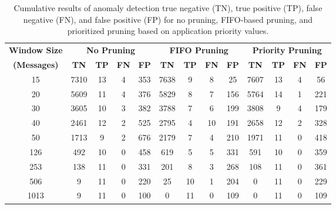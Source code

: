 \begin{table}[] \centering

\caption{Cumulative results of anomaly detection true negative (TN), true positive (TP), false negative (FN), and false positive (FP) for no pruning, FIFO-based pruning, and prioritized pruning based on application priority values.}\label{tab:results}

\begin{tabular}{c|cccc|cccc|cccc}
\textbf{Window Size} & \multicolumn{4}{|c}{\bf No Pruning} & \multicolumn{4}{|c}{\bf FIFO Pruning} & \multicolumn{4}{|c}{\bf Priority Pruning} \\
\textbf{(Messages)} & \textbf{TN} & \textbf{TP} & \textbf{FN} & \textbf{FP} & \textbf{TN} & \textbf{TP} & \textbf{FN} & \textbf{FP} & \textbf{TN} & \textbf{TP} & \textbf{FN} & \textbf{FP}\\ \midrule
15 & 7310 & 13 & 4 & 353 & 7638 & 9 & 8 & 25  & 7607 & 13 & 4 & 56 \\ 
20 & 5609 & 11 & 4 & 376 & 5829 & 8 & 7 & 156  & 5764 & 14 & 1 & 221  \\ 
30 & 3605 & 10 & 3 & 382 & 3788 & 7 & 6 & 199 & 3808 & 9 & 4 & 179 \\ 
40 & 2461 & 12 & 2 & 525  & 2795 & 4 & 10 & 191  & 2658 & 12 & 2 & 328\\ 
50 & 1713 & 9 & 2 & 676 & 2179 & 7 & 4 & 210 & 1971 & 11 & 0 & 418\\ 
126 & 492 & 10 & 0 & 458 & 619 & 5 & 5 & 331 & 591 & 10 & 0 & 359 \\ 
253 & 138 & 11 & 0 & 331 & 201 & 8 & 3 & 268 & 108 & 11 & 0 & 361 \\ 
506 & 9 & 11 & 0 & 220  & 25 & 10 & 1 & 204 & 0 & 11 & 0 & 229 \\ 
1013 & 9 & 11 & 0 & 100 & 0 & 11 & 0 & 109 & 0 & 11 & 0 & 109 \\
\end{tabular}

\end{table}

